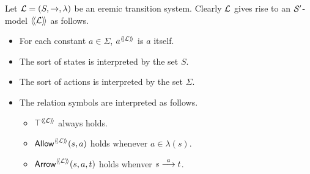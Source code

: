 \begin{definition}
Let $\mathcal{L} = (S, \rightarrow, \lambda)$ be an eremic transition
system. Clearly $\mathcal{L}$ gives rise to an $\mathcal{S}'$-model $\langle\!\langle \mathcal{L} \rangle\!\rangle$
as follows.
\begin{itemize}

\item For each constant $a \in \Sigma$, $a^{\langle\!\langle \mathcal{L} \rangle\!\rangle}$ is $a$ itself.

\item The sort of states is interpreted by the set $S$.

\item The sort of actions is interpreted by the set $\Sigma$.

\item The relation symbols are interpreted as follows.

  \begin{itemize}

    \item $\top^{\langle\!\langle \mathcal{L} \rangle\!\rangle}$ always holds.

    \item $\mathsf{Allow}^{\langle\!\langle \mathcal{L} \rangle\!\rangle}(s, a)$ holds whenever $a \in \lambda(s)$.

    \item $\mathsf{Arrow}^{\langle\!\langle \mathcal{L} \rangle\!\rangle}(s, a, t)$ holds whenver $s \stackrel{a}{\longrightarrow} t$.

  \end{itemize}
\end{itemize}
\end{definition}


